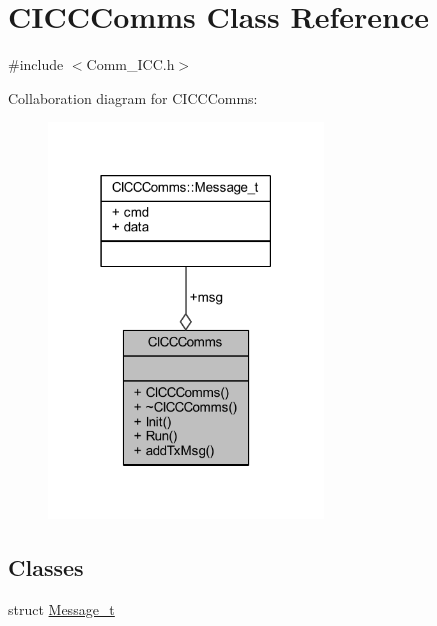 \hypertarget{class_c_i_c_c_comms}{}\section{C\+I\+C\+C\+Comms Class Reference}
\label{class_c_i_c_c_comms}


{\ttfamily \#include $<$Comm\+\_\+\+I\+C\+C.\+h$>$}



Collaboration diagram for C\+I\+C\+C\+Comms\+:
\nopagebreak
\begin{figure}[H]
\begin{center}
\leavevmode
\includegraphics[width=207pt]{class_c_i_c_c_comms__coll__graph}
\end{center}
\end{figure}
\subsection*{Classes}
\begin{DoxyCompactItemize}
\item 
struct \mbox{\hyperlink{struct_c_i_c_c_comms_1_1_message__t}{Message\+\_\+t}}
\end{DoxyCompactItemize}
